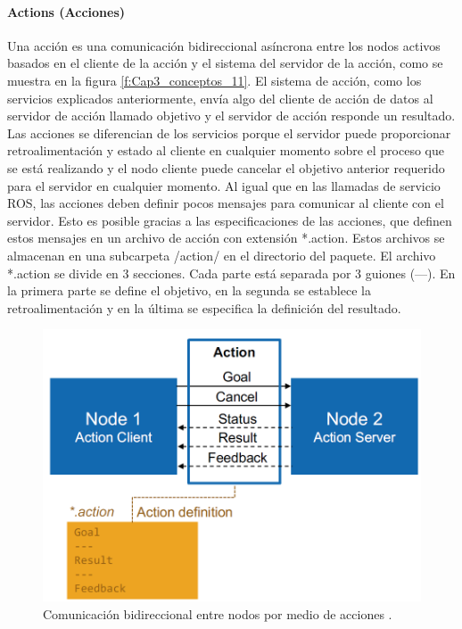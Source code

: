                \newpage

            \paragraph{ Actions (Acciones)}
                    Una acción es una comunicación bidireccional asíncrona entre los nodos activos basados en el cliente de la acción y el sistema del servidor de la acción, como se muestra en la figura \eqref{f:Cap3_conceptos_11}. El sistema de acción, como los servicios explicados anteriormente, envía algo del cliente de acción de datos al servidor de acción llamado objetivo y el servidor de acción responde un resultado. Las acciones se diferencian de los servicios porque el servidor puede proporcionar retroalimentación y estado al cliente en cualquier momento sobre el proceso que se está realizando y el nodo cliente puede cancelar el objetivo anterior requerido para el servidor en cualquier momento.
                    Al igual que en las llamadas de servicio ROS, las acciones deben definir pocos mensajes para comunicar al cliente con el servidor. Esto es posible gracias a las especificaciones de las acciones, que definen estos mensajes en un archivo de acción con extensión *.action. Estos archivos se almacenan en una subcarpeta /action/ en el directorio del paquete.
                    El archivo *.action se divide en 3 secciones. Cada parte está separada por 3 guiones (---). En la primera parte se define el objetivo, en la segunda se establece la retroalimentación y en la última se especifica la definición del resultado.

            \begin{figure}[htb]
                \centering
                \includegraphics[width=0.7\linewidth]{Main/Chapter3/Images3/action_diagram.png}
                \caption{Comunicación bidireccional entre nodos por medio de acciones \cite{rosmaster_diagram}.}
                \label{f:Cap3_conceptos_11}
            \end{figure}             

